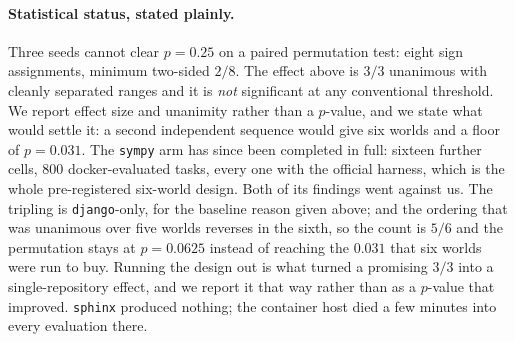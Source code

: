 \paragraph{Statistical status, stated plainly.}
Three seeds cannot clear $p = 0.25$ on a paired permutation test: eight
sign assignments, minimum two-sided $2/8$. The effect above is $3/3$
unanimous with cleanly separated ranges and it is \emph{not} significant
at any conventional threshold. We report effect size and unanimity
rather than a $p$-value, and we state what would settle it: a second
independent sequence would give six worlds and a floor of $p = 0.031$.
The \texttt{sympy} arm has since been completed in full: sixteen further
cells, $800$ docker-evaluated tasks, every one with the official harness,
which is the whole pre-registered six-world design. Both of its findings
went against us. The tripling is \texttt{django}-only, for the baseline
reason given above; and the ordering that was unanimous over five worlds
reverses in the sixth, so the count is $5/6$ and the permutation stays at
$p = 0.0625$ instead of reaching the $0.031$ that six worlds were run to
buy. Running the design out is what turned a promising $3/3$ into a
single-repository effect, and we report it that way rather than as a
$p$-value that improved.
\texttt{sphinx} produced nothing; the container host died a few minutes
into every evaluation there.
